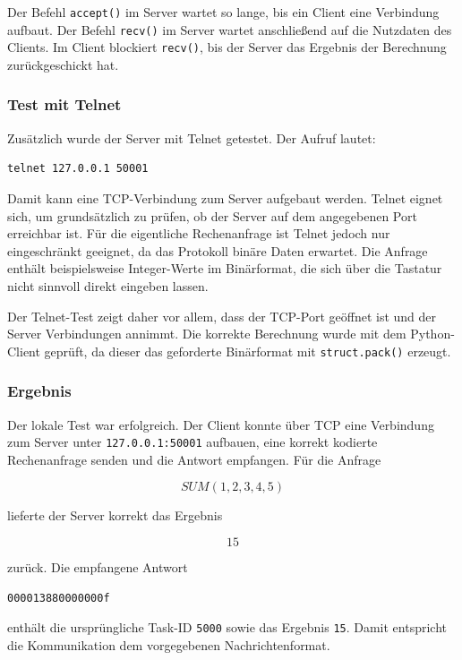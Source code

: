 \documentclass{kdiartcl}
\begin{document}
Der Befehl \texttt{accept()} im Server wartet so lange, bis ein Client eine Verbindung
aufbaut. Der Befehl \texttt{recv()} im Server wartet anschließend auf die Nutzdaten des
Clients. Im Client blockiert \texttt{recv()}, bis der Server das Ergebnis der Berechnung
zurückgeschickt hat.

\subsubsection{Test mit Telnet}

Zusätzlich wurde der Server mit Telnet getestet. Der Aufruf lautet:

\begin{verbatim}
telnet 127.0.0.1 50001
\end{verbatim}

Damit kann eine TCP-Verbindung zum Server aufgebaut werden. Telnet eignet sich, um
grundsätzlich zu prüfen, ob der Server auf dem angegebenen Port erreichbar ist. Für die
eigentliche Rechenanfrage ist Telnet jedoch nur eingeschränkt geeignet, da das Protokoll
binäre Daten erwartet. Die Anfrage enthält beispielsweise Integer-Werte im Binärformat,
die sich über die Tastatur nicht sinnvoll direkt eingeben lassen.

Der Telnet-Test zeigt daher vor allem, dass der TCP-Port geöffnet ist und der Server
Verbindungen annimmt. Die korrekte Berechnung wurde mit dem Python-Client geprüft,
da dieser das geforderte Binärformat mit \texttt{struct.pack()} erzeugt.

\subsubsection{Ergebnis}

Der lokale Test war erfolgreich. Der Client konnte über TCP eine Verbindung zum Server
unter \texttt{127.0.0.1:50001} aufbauen, eine korrekt kodierte Rechenanfrage senden und
die Antwort empfangen. Für die Anfrage

\[
SUM(1,2,3,4,5)
\]

lieferte der Server korrekt das Ergebnis

\[
15
\]

zurück. Die empfangene Antwort

\begin{verbatim}
000013880000000f
\end{verbatim}

enthält die ursprüngliche Task-ID \texttt{5000} sowie das Ergebnis \texttt{15}. Damit
entspricht die Kommunikation dem vorgegebenen Nachrichtenformat.
\end{document}
